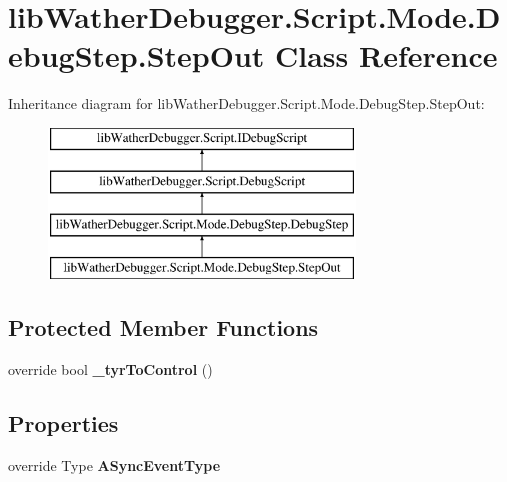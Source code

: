 \hypertarget{classlib_wather_debugger_1_1_script_1_1_mode_1_1_debug_step_1_1_step_out}{\section{lib\+Wather\+Debugger.\+Script.\+Mode.\+Debug\+Step.\+Step\+Out Class Reference}
\label{classlib_wather_debugger_1_1_script_1_1_mode_1_1_debug_step_1_1_step_out}
}
Inheritance diagram for lib\+Wather\+Debugger.\+Script.\+Mode.\+Debug\+Step.\+Step\+Out\+:\begin{figure}[H]
\begin{center}
\leavevmode
\includegraphics[height=4.000000cm]{classlib_wather_debugger_1_1_script_1_1_mode_1_1_debug_step_1_1_step_out}
\end{center}
\end{figure}
\subsection*{Protected Member Functions}
\begin{DoxyCompactItemize}
\item 
\hypertarget{classlib_wather_debugger_1_1_script_1_1_mode_1_1_debug_step_1_1_step_out_aed8ce25c757713bda12799a0fa090c4c}{override bool {\bfseries \+\_\+tyr\+To\+Control} ()}\label{classlib_wather_debugger_1_1_script_1_1_mode_1_1_debug_step_1_1_step_out_aed8ce25c757713bda12799a0fa090c4c}

\end{DoxyCompactItemize}
\subsection*{Properties}
\begin{DoxyCompactItemize}
\item 
\hypertarget{classlib_wather_debugger_1_1_script_1_1_mode_1_1_debug_step_1_1_step_out_adeb45ac0adec1b60cec30764e97fab65}{override Type {\bfseries A\+Sync\+Event\+Type}}\label{classlib_wather_debugger_1_1_script_1_1_mode_1_1_debug_step_1_1_step_out_adeb45ac0adec1b60cec30764e97fab65}

\end{DoxyCompactItemize}
